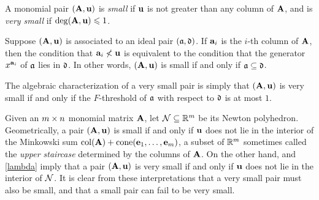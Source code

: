 \documentclass{amsart}
\begin{document}
\begin{definition}
   \label{defn: small and very small pairs}
A monomial pair $(\mathbf{A}, \mathbf{u})$ is \emph{small} if $\mathbf{u}$ is not greater than any column of $\mathbf{A}$, and is \emph{very small} if $\operatorname{deg}(\mathbf{A},\mathbf{u}) \leqslant 1$.
\end{definition}

\begin{remark}
\label{algebraic small and very small: R}
  Suppose $(\mathbf{A}, \mathbf{u})$ is associated to an ideal pair $(\mathfrak{a}, \mathfrak{d})$.  If $\mathbf{a}_i$ is the $i$-th column of $\mathbf{A}$, then the condition that $\mathbf{a}_i \not < \mathbf{u}$ is equivalent to the condition that the generator $x^{\mathbf{a}_i}$ of $\mathfrak{a}$ lies in $\mathfrak{d}$.  In other words, $(\mathbf{A}, \mathbf{u})$ is small if and only if $\mathfrak{a} \subseteq \mathfrak{d}$.

The algebraic characterization of a very small pair is simply that $(\mathbf{A}, \mathbf{u})$ is very small if and only if the $F$-threshold of $\mathfrak{a}$ with respect to $\mathfrak{d}$ is at most $1$.
\end{remark}

\begin{remark}
\label{geometric small and very small: R}
Given an $m \times n$ monomial matrix $\mathbf{A}$, let $\mathcal{N} \subseteq \mathbb{R}^{m}$ be its Newton polyhedron.
Geometrically, a pair $(\mathbf{A}, \mathbf{u})$ is small if and only if $\mathbf{u}$ does not lie in the interior of the Minkowski sum $\operatorname{col}(\mathbf{A}) + \operatorname{cone}(\mathbf{e}_1,\ldots,\mathbf{e}_m)$, a subset of $\mathbb{R}^{m}$ sometimes called the \emph{upper staircase} determined by the columns of $\mathbf{A}$.
On the other hand,  and \ref{lambda} imply that a pair $(\mathbf{A}, \mathbf{u})$ is very small if and only if $\mathbf{u}$ does not lie in the interior of $\mathcal{N}$.
It is clear from these interpretations that a very small pair must also be small, and that a small pair can fail to be very small.
\end{remark}
\end{document}
